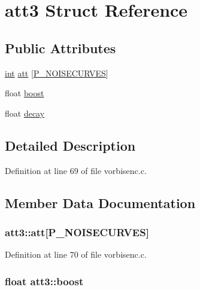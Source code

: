 \hypertarget{structatt3}{}\section{att3 Struct Reference}
\label{structatt3}
\subsection*{Public Attributes}
\begin{DoxyCompactItemize}
\item 
\hyperlink{xmltok_8h_a5a0d4a5641ce434f1d23533f2b2e6653}{int} \hyperlink{structatt3_a59582b74ab82141600c65f30d8459632}{att} \mbox{[}\hyperlink{psy_8h_a179ea3e4fa2cdb1ef235e922ea51405a}{P\+\_\+\+N\+O\+I\+S\+E\+C\+U\+R\+V\+ES}\mbox{]}
\item 
float \hyperlink{structatt3_a3f4c1b26c34e25a579287669743f32a4}{boost}
\item 
float \hyperlink{structatt3_a9149df466d618da5dde12351152ecab4}{decay}
\end{DoxyCompactItemize}


\subsection{Detailed Description}


Definition at line 69 of file vorbisenc.\+c.



\subsection{Member Data Documentation}
\subsubsection[{\texorpdfstring{att}{att}}]{ att3\+::att\mbox{[}{\bf P\+\_\+\+N\+O\+I\+S\+E\+C\+U\+R\+V\+ES}\mbox{]}}\hypertarget{structatt3_a59582b74ab82141600c65f30d8459632}{}\label{structatt3_a59582b74ab82141600c65f30d8459632}


Definition at line 70 of file vorbisenc.\+c.

\subsubsection[{\texorpdfstring{boost}{boost}}]{\setlength{\rightskip}{0pt plus 5cm}float att3\+::boost}\hypertarget{structatt3_a3f4c1b26c34e25a579287669743f32a4}{}\label{structatt3_a3f4c1b26c34e25a579287669743f32a4}


